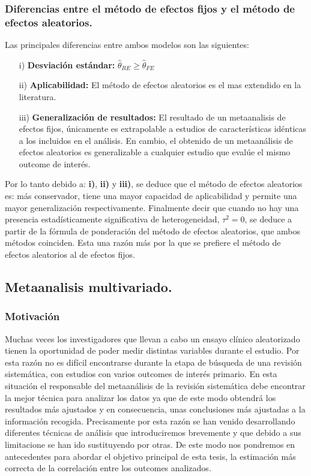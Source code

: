 \documentclass[a4paper,openright,12pt]{report}
\begin{document}
\subsubsection{Diferencias entre el método de efectos fijos y el método de efectos aleatorios.}
Las principales diferencias entre ambos modelos son las siguientes:
\begin{itemize}
\item[i)] \textbf{Desviación estándar:} $\widehat{\theta}_{RE}\geq\widehat{\theta}_{FE}$
\item[ii)] \textbf{Aplicabilidad:} El método de efectos aleatorios es el mas extendido en la literatura.
\item[iii)] \textbf{Generalización de resultados:} El resultado de un metaanalisis de efectos fijos, únicamente es extrapolable a estudios de características idénticas a los incluidos en el análisis. En cambio, el obtenido de un metaanálisis de efectos aleatorios es generalizable a cualquier estudio que evalúe el mismo outcome de interés.
\end{itemize}
Por lo tanto debido a: \textbf{i)}, \textbf{ii)} y \textbf{iii)}, se deduce que el método de efectos aleatorios es: más conservador, tiene una mayor capacidad de aplicabilidad y permite una mayor generalización respectivamente. Finalmente decir que cuando no hay una presencia estadísticamente significativa de heterogeneidad, $\tau^{2}=0$, se deduce a partir de la fórmula de ponderación del método de efectos aleatorios, que ambos métodos coinciden. Esta una razón más por la que se prefiere el método de efectos aleatorios al de efectos fijos. 
\newpage
\subsection{Metaanalisis multivariado.}
\subsubsection{Motivación}
Muchas veces los investigadores que llevan a cabo un ensayo clínico aleatorizado tienen la oportunidad de poder medir distintas variables durante el estudio. Por esta razón no es difícil encontrarse durante la etapa de búsqueda de una revisión sistemática, con estudios con varios outcomes de interés primario. En esta situación el responsable del metaanálisis de la revisión sistemática debe encontrar la mejor técnica para analizar los datos ya que de este modo obtendrá los resultados más ajustados y en consecuencia, unas conclusiones más ajustadas a la información recogida.
Precisamente por esta razón se han venido desarrollando diferentes técnicas de análisis que introduciremos brevemente y que debido a sus limitacione se han ido sustituyendo por otras. De este modo nos pondremos en antecedentes para abordar el objetivo principal de esta tesis, la estimación más correcta de la correlación entre los outcomes analizados.
\end{document}
